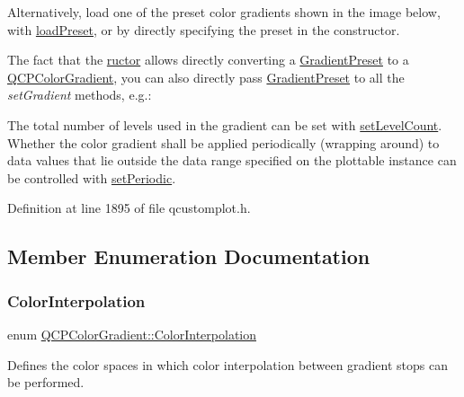Alternatively, load one of the preset color gradients shown in the image below, with \hyperlink{class_q_c_p_color_gradient_aa0aeec1528241728b9671bf8e60b1622}{load\+Preset}, or by directly specifying the preset in the constructor.



The fact that the \hyperlink{class_q_c_p_color_gradient}{ructor} allows directly converting a \hyperlink{class_q_c_p_color_gradient_aed6569828fee337023670272910c9072}{Gradient\+Preset} to a \hyperlink{class_q_c_p_color_gradient}{Q\+C\+P\+Color\+Gradient}, you can also directly pass \hyperlink{class_q_c_p_color_gradient_aed6569828fee337023670272910c9072}{Gradient\+Preset} to all the {\itshape set\+Gradient} methods, e.\+g.\+: 
\begin{DoxyCodeInclude}
\end{DoxyCodeInclude}
 The total number of levels used in the gradient can be set with \hyperlink{class_q_c_p_color_gradient_a18da587eb4f7fc788ea28ba15b6a12de}{set\+Level\+Count}. Whether the color gradient shall be applied periodically (wrapping around) to data values that lie outside the data range specified on the plottable instance can be controlled with \hyperlink{class_q_c_p_color_gradient_a39d6448155fc00a219f239220d14bb39}{set\+Periodic}. 

Definition at line 1895 of file qcustomplot.\+h.



\subsection{Member Enumeration Documentation}
\mbox{\label{class_q_c_p_color_gradient_ac5dca17cc24336e6ca176610e7f77fc1}} 
\subsubsection{\texorpdfstring{Color\+Interpolation}{ColorInterpolation}}
{\footnotesize\ttfamily enum \hyperlink{class_q_c_p_color_gradient_ac5dca17cc24336e6ca176610e7f77fc1}{Q\+C\+P\+Color\+Gradient\+::\+Color\+Interpolation}}

Defines the color spaces in which color interpolation between gradient stops can be performed.


